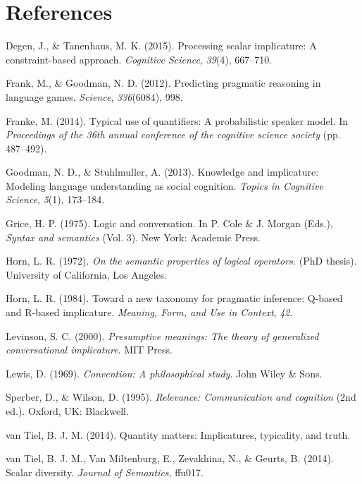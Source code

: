 \documentclass[10pt, letterpaper]{article}
\begin{document}
\section{References}\label{references}

\setlength{\parindent}{-0.1in} \setlength{\leftskip}{0.125in} \noindent

Degen, J., \& Tanenhaus, M. K. (2015). Processing scalar implicature: A
constraint-based approach. \emph{Cognitive Science}, \emph{39}(4),
667--710.

Frank, M., \& Goodman, N. D. (2012). Predicting pragmatic reasoning in
language games. \emph{Science}, \emph{336}(6084), 998.

Franke, M. (2014). Typical use of quantifiers: A probabilistic speaker
model. In \emph{Proceedings of the 36th annual conference of the
cognitive science society} (pp. 487--492).

Goodman, N. D., \& Stuhlmuller, A. (2013). Knowledge and implicature:
Modeling language understanding as social cognition. \emph{Topics in
Cognitive Science}, \emph{5}(1), 173--184.

Grice, H. P. (1975). Logic and conversation. In P. Cole \& J. Morgan
(Eds.), \emph{Syntax and semantics} (Vol. 3). New York: Academic Press.

Horn, L. R. (1972). \emph{On the semantic properties of logical
operators.} (PhD thesis). University of California, Los Angeles.

Horn, L. R. (1984). Toward a new taxonomy for pragmatic inference:
Q-based and R-based implicature. \emph{Meaning, Form, and Use in
Context}, \emph{42}.

Levinson, S. C. (2000). \emph{Presumptive meanings: The theory of
generalized conversational implicature}. MIT Press.

Lewis, D. (1969). \emph{Convention: A philosophical study}. John Wiley
\& Sons.

Sperber, D., \& Wilson, D. (1995). \emph{Relevance: Communication and
cognition} (2nd ed.). Oxford, UK: Blackwell.

{van Tiel}, B. J. M. (2014). Quantity matters: Implicatures, typicality,
and truth.

{van Tiel}, B. J. M., Van Miltenburg, E., Zevakhina, N., \& Geurts, B.
(2014). Scalar diversity. \emph{Journal of Semantics}, ffu017.
\end{document}
